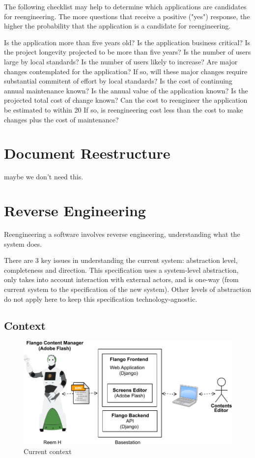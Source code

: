     
    The following checklist may help to determine which applications are candidates for reengineering. The more questions that receive a positive ("yes") response, the higher the probability that the application is a candidate for reengineering.

    Is the application more than five years old?
    Is the application business critical?
    Is the project longevity projected to be more than five years?
    Is the number of users large by local standards?
    Is the number of users likely to increase?
    Are major changes contemplated for the application?
    If so, will these major changes require substantial commitent of effort by local standards?
    Is the cost of continuing annual maintenance known?
    Is the annual value of the application known?
    Is the projected total cost of change known?
    Can the cost to reengineer the application be estimated to within 20%
    If so, is reengineering cost less than the cost to make changes plus the cost of maintenance?

\section{Document Reestructure}
maybe we don't need this.

\section{Reverse Engineering}
\label{sec:context}
Reengineering a software involves reverse engineering, understanding what the system does.

There are 3 key issues in understanding the current system: abstraction level, completeness and direction.
This specification uses a system-level abstraction, only takes into account interaction with external actors, and is one-way (from current system to the specification of the new system).
Other levels of abstraction do not apply here to keep this specification technology-agnostic.

\subsection{Context}
\begin{figure}[htb]
    \centering
    \includegraphics[width=\textwidth]{figures/context-original}
    \caption{Current context}
    \label{fig:context-original}
\end{figure}

